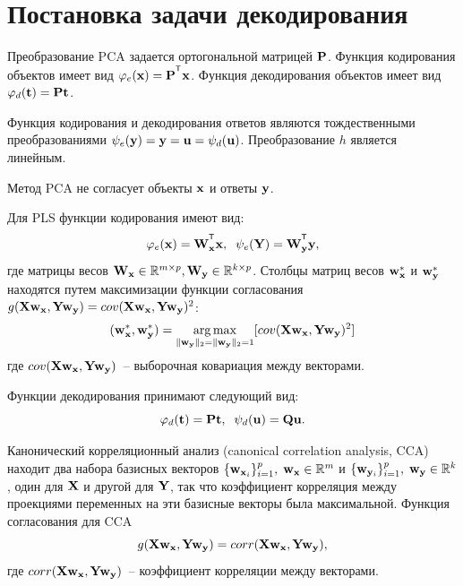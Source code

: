 \chapter{Постановка задачи декодирования}

Преобразование PCA задается ортогональной матрицей $\mathbf{P}$. Функция кодирования объектов имеет вид $\varphi_e(\bx) = \bP^{\T}\bx$. Функция декодирования объектов имеет вид $\varphi_d(\mathbf{t}) = \mathbf{P}\mathbf{t}$. 

Функция кодирования и декодирования ответов являются тождественными преобразованиями $\psi_e(\mathbf{y}) =  \mathbf{y} = \mathbf{u} = \psi_d(\mathbf{u})$. Преобразование $h$ является линейным.

Метод PCA не согласует объекты $\mathbf{x}$ и ответы $\mathbf{y}$.


\hrulefill

Для PLS  функции кодирования имеют вид:
\begin{equation}
	\varphi_e(\bx) = \bW_{\bx}^{\T}\bx , \;\;
	\psi_e(\bY) = \bW_{\by}^{\T}\by ,
\end{equation} 
где матрицы весов $\mathbf{W}_{\mathbf{x}} \in \mathbb{R}^{m \times p}, \mathbf{W}_{\mathbf{y}} \in \mathbb{R}^{k \times p}$. Столбцы матриц весов $\mathbf{w}_{\mathbf{x}}^{*}$ и $\mathbf{w}_{\mathbf{y}}^{*}$ 
находятся путем максимизации функции согласования $g(\mathbf{X} \mathbf{w}_{\mathbf{x}}, \mathbf{Y} \mathbf{w}_{\mathbf{y}}) = cov (\mathbf{X} \mathbf{w}_{\mathbf{x}}, \mathbf{Y} \mathbf{w}_{\mathbf{y}})^{2}$:
\begin{equation}
	(\mathbf{w}_{\mathbf{x}}^{*}, \mathbf{w}_{\mathbf{y}}^{*}) = \mathop{\arg \max}\limits_{\|\mathbf{w}_{\mathbf{y}}\|_{2}=\|\mathbf{w}_{\mathbf{y}}\|_{2}=1}[ cov(\mathbf{X} \mathbf{w}_{\mathbf{x}}, \mathbf{Y} \mathbf{w}_{\mathbf{y}})^{2}]
	\label{eq:PLSpr3}
\end{equation}
где $cov(\mathbf{X} \mathbf{w}_{\mathbf{x}}, \mathbf{Y} \mathbf{w}_{\mathbf{y}})$~-- выборочная ковариация между векторами.

Функции декодирования принимают следующий вид:
\begin{equation}
	\varphi_d(\mathbf{t}) = \mathbf{P}\mathbf{t}, \;\;
	\psi_d(\mathbf{u}) = \mathbf{Q}\mathbf{u}.
\end{equation} 

\hrulefill

Канонический корреляционный анализ (canonical correlation analysis, CCA) находит два набора базисных векторов $\{\mathbf{w}_{\mathbf{x}_i}\}_{i=1}^{p}, \; \mathbf{w}_{\mathbf{x}} \in \mathbb{R}^{m}$ и $\{\mathbf{w}_{\mathbf{y}_i}\}_{i=1}^{p}, \; \mathbf{w}_{\mathbf{y}} \in \mathbb{R}^{k}$, один для $\mathbf{X}$ и другой для $\mathbf{Y}$, так что коэффициент корреляция между проекциями переменных на эти базисные векторы была максимальной. Функция согласования для CCA
\begin{equation}
	g(\mathbf{X} \mathbf{w}_{\mathbf{x}}, \mathbf{Y} \mathbf{w}_{\mathbf{y}}) = corr(\mathbf{X} \mathbf{w}_{\mathbf{x}}, \mathbf{Y} \mathbf{w}_{\mathbf{y}}),
\end{equation} 
где $corr(\mathbf{X} \mathbf{w}_{\mathbf{x}}, \mathbf{Y} \mathbf{w}_{\mathbf{y}})$~-- коэффициент корреляции между векторами.

